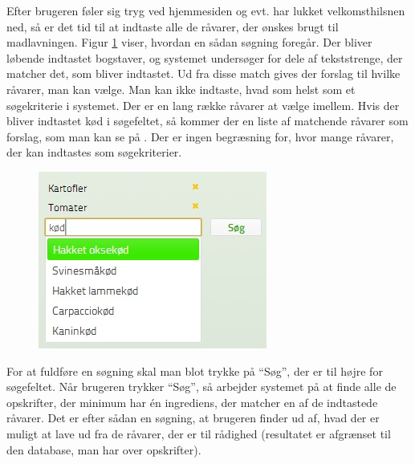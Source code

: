 Efter brugeren føler sig tryg ved hjemmesiden og evt. har lukket velkomsthilsnen ned, så er det tid til at indtaste alle de råvarer, der ønskes brugt til madlavningen. Figur \ref{fig:foodl-soegefelt} viser, hvordan en sådan søgning foregår. Der bliver løbende indtastet bogstaver, og systemet undersøger for dele af tekststrenge, der matcher det, som bliver indtastet. Ud fra disse match gives der forslag til hvilke råvarer, man kan vælge. Man kan ikke indtaste, hvad som helst som et søgekriterie i systemet. Der er en lang række råvarer at vælge imellem. Hvis der \fx bliver indtastet kød i søgefeltet, så kommer der en liste af matchende råvarer som forslag, som man kan se på . Der er ingen begræsning for, hvor mange råvarer, der kan indtastes som søgekriterier.

\begin{figure}[H]
	\centering
	\includegraphics[scale=0.7]{billeder/foodl/soegefelt.jpg}
	\label{fig:foodl-soegefelt}
\end{figure}


For at fuldføre en søgning skal man blot trykke på ``Søg'', der er til højre for søgefeltet. Når brugeren trykker ``Søg'', så arbejder systemet på at finde alle de opskrifter, der minimum har én ingrediens, der matcher en af de indtastede råvarer. Det er efter sådan en søgning, at brugeren finder ud af, hvad der er muligt at lave ud fra de råvarer, der er til rådighed (resultatet er afgrænset til den database, man har over opskrifter).
